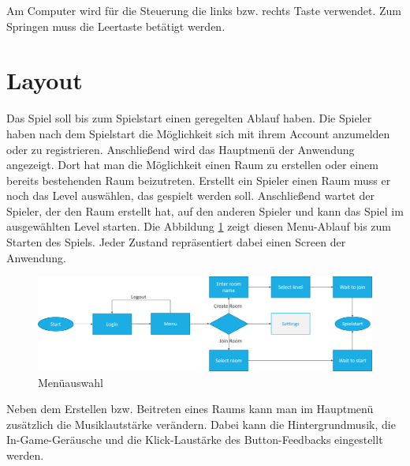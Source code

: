 Am Computer wird für die Steuerung die links bzw. rechts Taste verwendet. Zum Springen muss die Leertaste betätigt werden.


\section{Layout}
\label{sec:konzeption:layout}
Das Spiel soll bis zum Spielstart einen geregelten Ablauf haben. Die Spieler haben nach dem Spielstart die Möglichkeit sich mit ihrem Account anzumelden oder zu registrieren. Anschließend wird das Hauptmenü der Anwendung angezeigt. Dort hat man die Möglichkeit einen Raum zu erstellen oder einem bereits bestehenden Raum beizutreten. Erstellt ein Spieler einen Raum muss er noch das Level auswählen, das gespielt werden soll. Anschließend wartet der Spieler, der den Raum erstellt hat, auf den anderen Spieler und kann das Spiel im ausgewählten Level starten. Die Abbildung \ref{fig:konzeption:layout:menu} zeigt diesen Menu-Ablauf bis zum Starten des Spiels. Jeder Zustand repräsentiert dabei einen Screen der Anwendung. 

\begin{figure}[H]
    \begin{center}
      \includegraphics[width=\linewidth]{img/konzeption/Spielablauf2}
      \caption{Menüauswahl}
      \label{fig:konzeption:layout:menu}
    \end{center}
\end{figure}

Neben dem Erstellen bzw. Beitreten eines Raums kann man im Hauptmenü zusätzlich die Musiklautstärke verändern. Dabei kann die Hintergrundmusik, die In-Game-Geräusche und die Klick-Laustärke des Button-Feedbacks eingestellt werden.